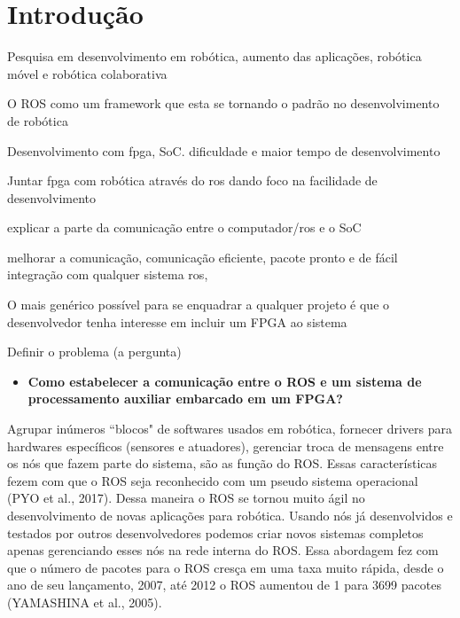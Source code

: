\chapter{Introdução}

Pesquisa em desenvolvimento em robótica, aumento das aplicações, robótica móvel e robótica
colaborativa

O ROS como um framework que esta se tornando o padrão no desenvolvimento de robótica

Desenvolvimento com fpga, SoC. dificuldade e maior tempo de desenvolvimento 

Juntar fpga com robótica através do ros dando foco na facilidade de desenvolvimento


explicar a parte da comunicação entre o computador/ros e o SoC

melhorar a comunicação, comunicação eficiente, pacote pronto e de fácil integração com qualquer sistema 
ros,

O mais genérico possível para se enquadrar a qualquer projeto é que o desenvolvedor tenha
interesse em incluir um FPGA ao sistema


Definir o problema (a pergunta)

\begin{itemize}
    \item \textbf{Como estabelecer a comunicação entre o ROS e um sistema de processamento auxiliar 
embarcado em um FPGA?}

\end{itemize}






Agrupar inúmeros “blocos" de softwares usados em robótica, fornecer drivers para hardwares
específicos (sensores e atuadores), gerenciar troca de mensagens entre os nós que fazem 
parte do sistema, são as função do ROS. Essas características fezem com que o ROS seja 
reconhecido com um pseudo sistema operacional (PYO et al., 2017). Dessa maneira o ROS se 
tornou muito ágil no desenvolvimento de novas aplicações para robótica. Usando nós já 
desenvolvidos e testados por outros desenvolvedores podemos criar novos sistemas 
completos apenas gerenciando esses nós na rede interna do ROS. Essa abordagem fez com 
que o número de pacotes para o ROS cresça em uma taxa muito rápida, desde o ano de seu 
lançamento, 2007, até 2012 o ROS aumentou de 1 para 3699 pacotes (YAMASHINA et al., 2005).

